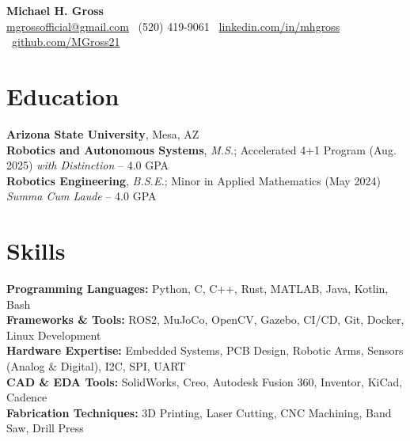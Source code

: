 \documentclass[10pt]{article}
\begin{document}

\begin{center}
    {\LARGE \textbf{Michael H. Gross}} \\
    \href{mailto:mgrossofficial@gmail.com}{mgrossofficial@gmail.com} \textbar\ (520) 419-9061 \textbar\ 
    \href{https://www.linkedin.com/in/mhgross}{linkedin.com/in/mhgross} \textbar\ \href{https://github.com/MGross21}{github.com/MGross21}
\end{center}

\section*{Education}
\textbf{Arizona State University}, Mesa, AZ \\
\textbf{Robotics and Autonomous Systems}, \textit{M.S.}; Accelerated 4+1 Program (Aug. 2025) \hfill \textit{with Distinction} -- 4.0 GPA \\
\textbf{Robotics Engineering}, \textit{B.S.E.}; Minor in Applied Mathematics (May 2024) \hfill \textit{Summa Cum Laude} -- 4.0 GPA

\section*{Skills}
\textbf{Programming Languages:} Python, C, C++, Rust, MATLAB, Java, Kotlin, Bash \\
\textbf{Frameworks \& Tools:} ROS2, MuJoCo, OpenCV, Gazebo, CI/CD, Git, Docker, Linux Development \\
\textbf{Hardware Expertise:} Embedded Systems, PCB Design, Robotic Arms, Sensors (Analog \& Digital), I2C, SPI, UART \\
\textbf{CAD \& EDA Tools:} SolidWorks, Creo, Autodesk Fusion 360, Inventor, KiCad, Cadence \\
\textbf{Fabrication Techniques:} 3D Printing, Laser Cutting, CNC Machining, Band Saw, Drill Press
\end{document}

